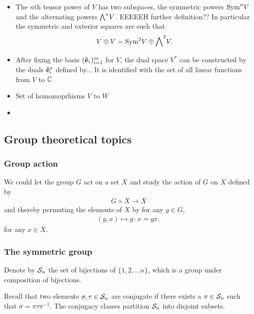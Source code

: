 \begin{itemize}
			\item The $n$th tensor power of $V$ has two subspaces, the symmetric powers $\text{Sym}^n V$ and the alternating powers ${\bigwedge}^n V$. EEEEEH further definition?? In particular the symmetric and exterior squares are such that
			\begin{align*}
				V \otimes V = \text{Sym}^2 V \oplus {\bigwedge}^2 V.
			\end{align*}
			
			\item After fixing the basis $(\mathbf{\hat{e}}_i)_{i=1}^m$ for $V$, the dual space $V^*$ can be constructed by the duals $\mathbf{\hat{e}}_i^*$ defined by... It is identified with the set of all linear functions from $V$ to $\mathbb{C}$
			
			\item Set of homomoprhisms $V$ to $W$
			
			\item 
		\end{itemize} 
		
	
\subsection{Group theoretical topics}

	\subsubsection{Group action}
	
		We could let the group $G$ act on a set $X$ and study the action of $G$ on $X$ defined by
		\begin{align*}
			G \times X \rightarrow X
		\end{align*}
		and thereby permuting the elements of $X$ by for any $g \in G$,
		\begin{align*}
			(g,x) \mapsto g \cdot x = gx,
		\end{align*}
		for any $x \in X$.
	
	\subsubsection{The symmetric group}
	
		Denote by $\mathcal{S}_n$ the set of bijections of $\{1, 2, \dots n\}$, which is a group under composition of bijections.
	
		Recall that two elements $\sigma, \tau \in \mathcal{S}_n$ are conjugate if there exists a $\pi \in \mathcal{S}_n$ such that $\sigma = \pi \tau \pi^{-1}$. The conjugacy classes partition $\mathcal{S}_n$ into disjoint subsets. 
		
